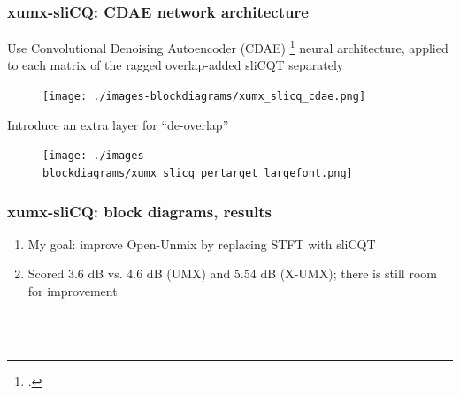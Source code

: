 \documentclass[usenames,dvipsnames]{beamer}
\begin{document}
\begin{frame}
	\frametitle{xumx-sliCQ: CDAE network architecture}
	Use Convolutional Denoising Autoencoder (CDAE) \footcite{plumbley1, plumbley2} neural architecture, applied to each matrix of the ragged overlap-added sliCQT separately
	\begin{figure}
		\vspace{-0.25em}
		\centering
		\texttt{[image: ./images-blockdiagrams/xumx\_slicq\_cdae.png]}
		\vspace{-0.25em}
	\end{figure}
	Introduce an extra layer for ``de-overlap''
	\begin{figure}
		\vspace{-0.25em}
		\centering
		\texttt{[image: ./images-blockdiagrams/xumx\_slicq\_pertarget\_largefont.png]}
		\vspace{-0.25em}
	\end{figure}
\end{frame}

\begin{frame}
	\frametitle{xumx-sliCQ: block diagrams, results}
	\begin{enumerate}
		\item
			My goal: improve Open-Unmix by replacing STFT with sliCQT
		\item
			Scored 3.6 dB vs. 4.6 dB (UMX) and 5.54 dB (X-UMX); there is still room for improvement
	\end{enumerate}
	\begin{figure}[ht]
		\centering
		\vspace{-1.15em}
		\\
		\vspace{-0.5em}
		\\
		\vspace{-0.5em}
	\end{figure}
\end{frame}
\end{document}
